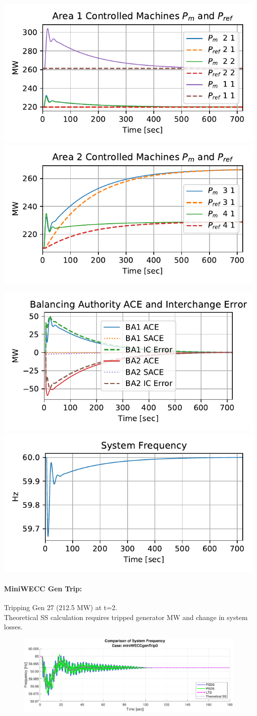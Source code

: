\documentclass[12pt]{article}
\begin{document}
\begin{minipage}{\linewidth}
		\includegraphics[width=.5\linewidth]{SixMachineStepBA4BA1}
		\includegraphics[width=.5\linewidth]{SixMachineStepBA4BA2}
\end{minipage}
\begin{minipage}{\linewidth}
		\includegraphics[width=.5\linewidth]{SixMachineStepBA4ACE}
		\includegraphics[width=.5\linewidth]{SixMachineStepBA4Freq}
\end{minipage}

\paragraph{MiniWECC Gen Trip:} Tripping Gen 27 (212.5 MW) at t=2. \\
Theoretical SS calculation requires tripped generator MW and change in system losses.
\begin{figure}[h!]
		\centering
		\includegraphics[width=\linewidth]{../../one_offs/miniWECC_v02/miniWECCgenTrip0Freq}\vspace{-1em}
\end{figure}
\end{document}
